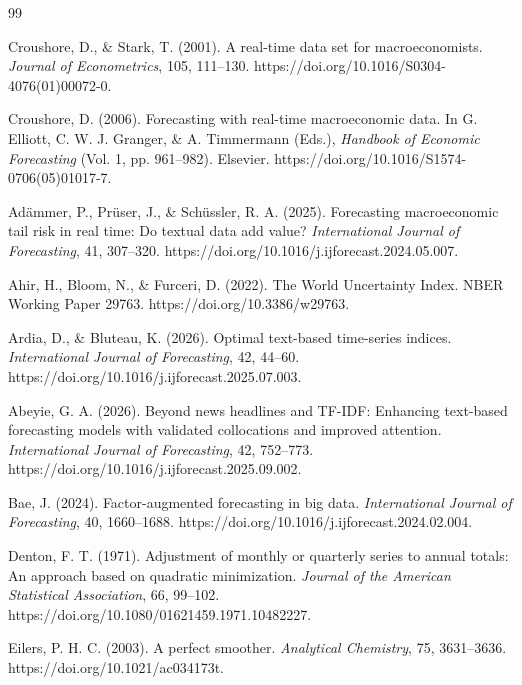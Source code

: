 \documentclass[preprint,12pt,authoryear]{elsarticle}
\begin{document}
\begingroup
\small
\setlength{\bibsep}{0pt plus 0.2ex}
\begin{thebibliography}{99}

Croushore, D., \& Stark, T. (2001). A real-time data set for macroeconomists.
\emph{Journal of Econometrics}, 105, 111--130.
https://doi.org/10.1016/S0304-4076(01)00072-0.

Croushore, D. (2006). Forecasting with real-time macroeconomic data. In
G. Elliott, C. W. J. Granger, \& A. Timmermann (Eds.), \emph{Handbook of
Economic Forecasting} (Vol. 1, pp. 961--982). Elsevier.
https://doi.org/10.1016/S1574-0706(05)01017-7.

Ad{\"a}mmer, P., Pr{\"u}ser, J., \& Sch{\"u}ssler, R. A. (2025). Forecasting
macroeconomic tail risk in real time: Do textual data add value?
\emph{International Journal of Forecasting}, 41, 307--320.
https://doi.org/10.1016/j.ijforecast.2024.05.007.

Ahir, H., Bloom, N., \& Furceri, D. (2022). The World Uncertainty Index.
NBER Working Paper 29763. https://doi.org/10.3386/w29763.

Ardia, D., \& Bluteau, K. (2026). Optimal text-based time-series indices.
\emph{International Journal of Forecasting}, 42, 44--60.
https://doi.org/10.1016/j.ijforecast.2025.07.003.

Abeyie, G. A. (2026). Beyond news headlines and TF-IDF: Enhancing text-based
forecasting models with validated collocations and improved attention.
\emph{International Journal of Forecasting}, 42, 752--773.
https://doi.org/10.1016/j.ijforecast.2025.09.002.

Bae, J. (2024). Factor-augmented forecasting in big data.
\emph{International Journal of Forecasting}, 40, 1660--1688.
https://doi.org/10.1016/j.ijforecast.2024.02.004.

Denton, F. T. (1971). Adjustment of monthly or quarterly series to annual
totals: An approach based on quadratic minimization. \emph{Journal of the
American Statistical Association}, 66, 99--102.
https://doi.org/10.1080/01621459.1971.10482227.

Eilers, P. H. C. (2003). A perfect smoother. \emph{Analytical Chemistry}, 75,
3631--3636. https://doi.org/10.1021/ac034173t.


\end{thebibliography}
\end{document}
